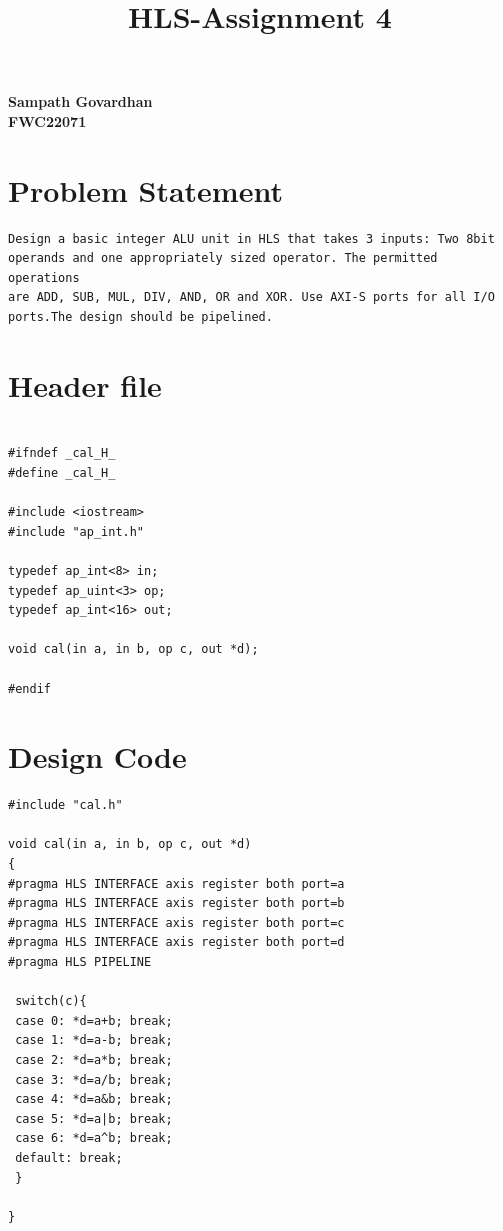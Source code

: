 \documentclass{article}
\title{
HLS-Assignment 4
}
\begin{document}
\maketitle
\hfill \textbf{Sampath Govardhan} \\
\null \hfill \textbf{FWC22071}\\

\section{Problem Statement}
\begin{lstlisting}
Design a basic integer ALU unit in HLS that takes 3 inputs: Two 8bit 
operands and one appropriately sized operator. The permitted operations 
are ADD, SUB, MUL, DIV, AND, OR and XOR. Use AXI-S ports for all I/O 
ports.The design should be pipelined.
\end{lstlisting}
\vspace{3cm}
\section{Header file}
\begin{lstlisting}

#ifndef _cal_H_
#define _cal_H_

#include <iostream>
#include "ap_int.h"

typedef ap_int<8> in;
typedef ap_uint<3> op;
typedef ap_int<16> out;

void cal(in a, in b, op c, out *d);

#endif
\end{lstlisting}
\section{Design Code}
\begin{lstlisting}
#include "cal.h"

void cal(in a, in b, op c, out *d)
{
#pragma HLS INTERFACE axis register both port=a
#pragma HLS INTERFACE axis register both port=b
#pragma HLS INTERFACE axis register both port=c
#pragma HLS INTERFACE axis register both port=d
#pragma HLS PIPELINE

 switch(c){
 case 0: *d=a+b; break;
 case 1: *d=a-b; break;
 case 2: *d=a*b; break;
 case 3: *d=a/b; break;
 case 4: *d=a&b; break;
 case 5: *d=a|b; break;
 case 6: *d=a^b; break;
 default: break;
 }

}



\end{lstlisting}
\vspace{5cm}
\end{document}

